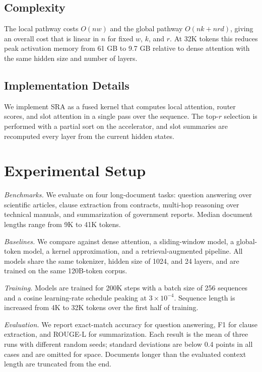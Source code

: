 \documentclass[conference,letterpaper]{IEEEtran}
\begin{document}
\subsection{Complexity}

The local pathway costs $O(nw)$ and the global pathway $O(nk + nrd)$, giving an overall cost that is linear in $n$ for fixed $w$, $k$, and $r$. At 32K tokens this reduces peak activation memory from 61 GB to 9.7 GB relative to dense attention with the same hidden size and number of layers.

\subsection{Implementation Details}

We implement SRA as a fused kernel that computes local attention, router scores, and slot attention in a single pass over the sequence. The top-$r$ selection is performed with a partial sort on the accelerator, and slot summaries are recomputed every layer from the current hidden states.

\section{Experimental Setup}

\textit{Benchmarks.} We evaluate on four long-document tasks: question answering over scientific articles, clause extraction from contracts, multi-hop reasoning over technical manuals, and summarization of government reports. Median document lengths range from 9K to 41K tokens.

\textit{Baselines.} We compare against dense attention, a sliding-window model, a global-token model, a kernel approximation, and a retrieval-augmented pipeline. All models share the same tokenizer, hidden size of 1024, and 24 layers, and are trained on the same 120B-token corpus.

\textit{Training.} Models are trained for 200K steps with a batch size of 256 sequences and a cosine learning-rate schedule peaking at $3 \times 10^{-4}$. Sequence length is increased from 4K to 32K tokens over the first half of training.

\textit{Evaluation.} We report exact-match accuracy for question answering, F1 for clause extraction, and ROUGE-L for summarization. Each result is the mean of three runs with different random seeds; standard deviations are below 0.4 points in all cases and are omitted for space. Documents longer than the evaluated context length are truncated from the end.
\end{document}
